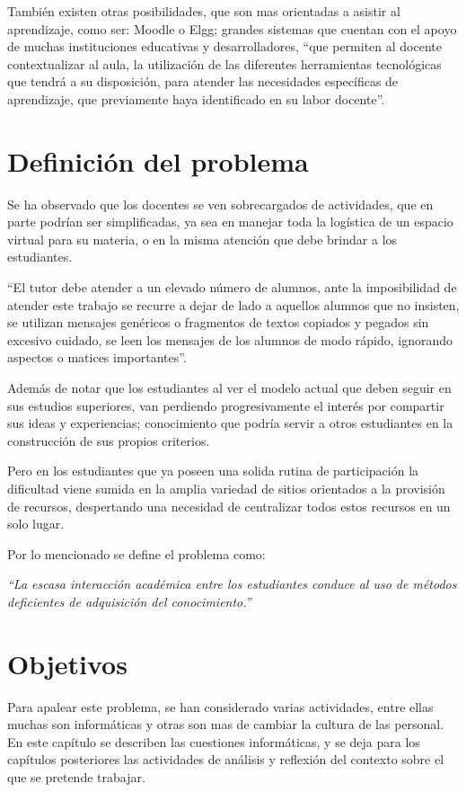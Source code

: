 También existen otras posibilidades, que son mas orientadas a asistir al aprendizaje, como ser: Moodle o Elgg; grandes sistemas que cuentan con el apoyo de muchas instituciones educativas y desarrolladores, “que permiten al docente contextualizar al aula, la utilización de las diferentes herramientas tecnológicas que tendrá a su disposición, para atender las  necesidades específicas de aprendizaje, que previamente haya identificado en su labor docente”\cite{Gonzalez}.

\section{Definición del problema}
Se ha observado que los docentes se ven sobrecargados de actividades, que en parte podrían ser simplificadas, ya sea en manejar toda la logística de un espacio virtual para su materia, o en la misma atención que debe brindar a los estudiantes.

“El tutor debe atender a un elevado número de alumnos, ante la imposibilidad de atender este trabajo se recurre a dejar de lado a aquellos alumnos que no insisten, se utilizan mensajes genéricos o fragmentos de textos copiados y pegados sin excesivo cuidado, se leen los mensajes de los alumnos de modo rápido, ignorando aspectos o matices importantes”\cite{Bartolome}.

Además de notar que los estudiantes al ver el modelo actual que deben seguir en sus estudios superiores, van perdiendo progresivamente el interés por compartir sus ideas y experiencias; conocimiento que podría servir a otros estudiantes en la construcción de sus propios criterios.

Pero en los estudiantes que ya poseen una solida rutina de participación la dificultad viene sumida en la amplia variedad de sitios orientados a la provisión de recursos, despertando una necesidad de centralizar todos estos recursos en un solo lugar.

Por lo mencionado se define el problema como:

\emph{“La escasa interacción académica entre los estudiantes conduce al uso de métodos deficientes de adquisición del conocimiento.”}

\section{Objetivos}
Para apalear este problema, se han considerado varias actividades, entre ellas muchas son informáticas y otras son mas de cambiar la cultura de las personal. En este capítulo se describen las cuestiones informáticas, y se deja para los capítulos posteriores las actividades de análisis y reflexión del contexto sobre el que se pretende trabajar.

